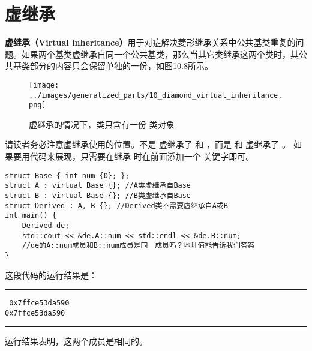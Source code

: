 \section{虚继承}
\textbf{虚继承（Virtual inheritance）}用于对症解决菱形继承关系中公共基类重复的问题。如果两个基类虚继承自同一个公共基类，那么当其它类继承这两个类时，其公共基类部分的内容只会保留单独的一份，如图10.8所示。\par
\begin{figure}[htbp]
    \centering
    \texttt{[image: ../images/generalized\_parts/10\_diamond\_virtual\_inheritance.png]}
    \caption{虚继承的情况下，\lstinline@Derived@ 类只含有一份 \lstinline@Base@ 类对象}
\end{figure}
请读者务必注意虚继承使用的位置。不是 \lstinline@Derived@ 虚继承了 \lstinline@A@ 和 \lstinline@B@，而是 \lstinline@A@ 和 \lstinline@B@ 虚继承了 \lstinline@Base@。
如果要用代码来展现，只需要在继承 \lstinline@Base@ 时在前面添加一个 \lstinline@virtual@ 关键字即可。
\begin{lstlisting}
struct Base { int num {0}; };
struct A : virtual Base {}; //A类虚继承自Base
struct B : virtual Base {}; //B类虚继承自Base
struct Derived : A, B {}; //Derived类不需要虚继承自A或B
int main() {
    Derived de;
    std::cout << &de.A::num << std::endl << &de.B::num;
    //de的A::num成员和B::num成员是同一成员吗？地址值能告诉我们答案
}
\end{lstlisting}
这段代码的运行结果是：\\\noindent\rule{\linewidth}{.2pt}\texttt{
0x7ffce53da590\\
0x7ffce53da590
}\\\noindent\rule{\linewidth}{.2pt}
运行结果表明，这两个成员是相同的。\par
